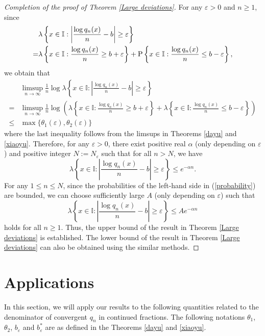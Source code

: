 \documentclass[reqno]{amsart}
\theoremstyle{definition}
\numberwithin{equation}{section}
\begin{document}
\begin{proof}[Completion of the proof of Theorem \ref{Large deviations}]
For any $\varepsilon>0$ and $n \geq 1$, since
\begin{align}\label{fenkai}
 &\lambda \left\{x \in \mathbb{I}: \left|\frac{\log q_n(x)}{n} - b\right| \geq \varepsilon\right\} \notag \\
=&\lambda \left\{x \in \mathbb{I}: \frac{\log q_n(x)}{n} \geq b + \varepsilon\right\} + \mathrm{P} \left\{x \in \mathbb{I}: \frac{\log q_n(x)}{n} \leq b - \varepsilon\right\},
\end{align}
we obtain that
\begin{align*}
 &\limsup_{n \to \infty} \frac{1}{n}\log \lambda \left\{x \in \mathbb{I}: \left|\frac{\log q_n(x)}{n} - b\right| \geq \varepsilon\right\} \\
=&\limsup_{n \to \infty} \frac{1}{n}\log \left(\lambda \left\{x \in \mathbb{I}: \frac{\log q_n(x)}{n} \geq b + \varepsilon\right\} + \lambda \left\{x \in \mathbb{I}: \frac{\log q_n(x)}{n} \leq b - \varepsilon\right\}\right)\\
\leq & \max\{\theta_1(\varepsilon),\theta_2(\varepsilon)\}
\end{align*}
where the last inequality follows from the limsups in Theorems \ref{dayu} and \ref{xiaoyu}. Therefore, for any $\varepsilon>0$, there exist positive real $\alpha$ (only depending on $\varepsilon$) and positive integer $N:=N_\varepsilon$ such that for all $n > N$, we have
\begin{equation}\label{probability}
\lambda \left\{x \in \mathbb{I}: \left|\frac{\log q_n(x)}{n} - b\right| \geq \varepsilon\right\} \leq e^{-\alpha n}.
\end{equation}
For any $1 \leq n \leq N$, since the probabilities of the left-hand side in (\ref{probability}) are bounded, we can choose sufficiently large $A$ (only depending on $\varepsilon$) such that
\[
\lambda \left\{x \in \mathbb{I}: \left|\frac{\log q_n(x)}{n} - b\right| \geq \varepsilon\right\} \leq Ae^{-\alpha n}
\]
holds for all $n \geq 1$. Thus, the upper bound of the result in Theorem \ref{Large deviations} is established. The lower bound of the result in Theorem \ref{Large deviations} can also be obtained using the similar methods.
\end{proof}

\section{Applications}
In this section, we will apply our results to the following quantities related to the denominator of convergent $q_n$ in continued fractions. The following notations $\theta_1$, $\theta_2$, $b_\varepsilon$ and $b^\ast_\varepsilon$ are as defined in the Theorems \ref{dayu} and \ref{xiaoyu}.
\end{document}
